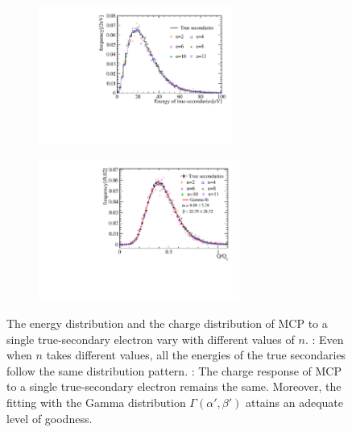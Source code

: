 \begin{figure}[htbp]
	\centering
	\begin{subfigure}{0.5\textwidth}
		\centering
		\includegraphics[height=4.5cm]{PMTRelated/GTmodel/single_pecharge.pdf}
		\caption{}
		\label{fig:single_pe}
	\end{subfigure}%
	\hfill
	\begin{subfigure}{0.5\textwidth}
		\centering
		\includegraphics[height=4.65cm]{PMTRelated/GTmodel/singlepefit.pdf}
		\caption{}
		\label{fig:single_fit}
	\end{subfigure}
	\caption{The energy distribution and the charge distribution of MCP to a single true-secondary electron vary with different values of \(n\). : Even when \(n\) takes different values, all the energies of the true secondaries follow the same distribution pattern. : The charge response of MCP to a single true-secondary electron remains the same. Moreover, the fitting with the Gamma distribution \(\varGamma(\alpha',\beta')\) attains an adequate level of goodness. }
	\label{fig:singlepe}
\end{figure}

